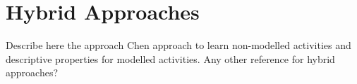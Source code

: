 \section{Hybrid Approaches}
\label{sec:soa:knowledgedriven}

Describe here the approach Chen approach to learn non-modelled activities and descriptive properties for modelled activities. Any other reference for hybrid approaches?